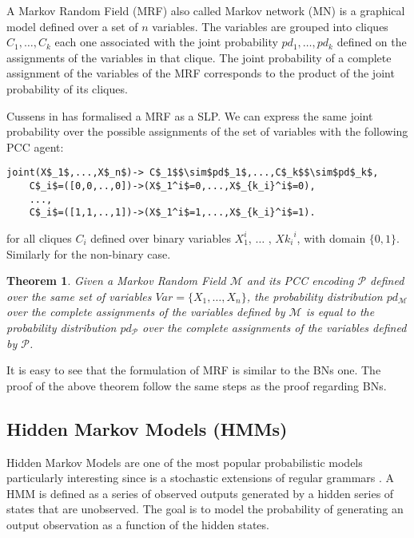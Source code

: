 \documentclass[letterpaper]{article}
\theoremstyle{plain}
\newtheorem{theorem}{Theorem}[section]
\theoremstyle{definition}
\theoremstyle{remark}
\theoremstyle{definition}
\begin{document}
A Markov Random Field (MRF) also called Markov network (MN) is a graphical model defined over a set of $n$ variables. The variables are grouped into cliques $C_1, \ldots , C_k$ each one associated with the joint probability $pd_1, \ldots , pd_k$ defined on the assignments of the variables in that clique. The joint probability of a complete assignment of the variables of the MRF corresponds to the product of the joint probability of its cliques.

Cussens in \cite{SLPcussens2001} has formalised a MRF as a SLP.
We can express the same joint probability over the possible assignments of the set of variables with the following PCC agent:
\begin{lstlisting}[mathescape=true]
joint(X$_1$,...,X$_n$)-> C$_1$$\sim$pd$_1$,...,C$_k$$\sim$pd$_k$, 
	C$_i$=([0,0,..,0])->(X$_1^i$=0,...,X$_{k_i}^i$=0),
	...,
	C$_i$=([1,1,..,1])->(X$_1^i$=1,...,X$_{k_i}^i$=1).
\end{lstlisting}
for all cliques $C_i$ defined over binary  variables $X_1^i$, $\ldots$ , $X{k_i}^i$, with domain $\{0,1\}$. Similarly for the non-binary case.


\begin{theorem}
Given a Markov Random Field $\mathcal{M}$ and its PCC encoding $\mathcal{P}$ defined over the same set of variables $Var= \{X_1, \ldots, X_n\}$, the probability distribution $pd_{\mathcal{M}}$ over the complete assignments of the variables defined by $\mathcal{M}$ is equal to the probability distribution $pd_{\mathcal{P}}$ over the complete assignments of the variables defined by $\mathcal{P}$.
\end{theorem}
It is easy to see that the formulation of MRF is similar to the BNs one. The proof of the above theorem follow the same steps as the proof regarding BNs.




\subsection{Hidden Markov Models (HMMs)}

 Hidden Markov Models are one of the most popular probabilistic models particularly interesting since is a stochastic extensions of regular grammars \cite{chomsky_book}. A HMM is defined as a series of observed outputs generated by a hidden series of states that are unobserved.
The goal is to model the probability of generating an output observation as a function of the hidden states.
\end{document}
